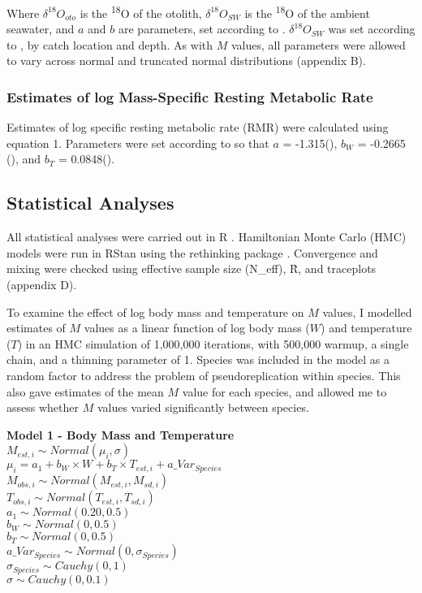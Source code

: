 \documentclass[12pt, titlepage]{article}
\begin{document}
\noindent Where $\delta^{18}O_{oto}$ is the \textdelta \textsuperscript{18}O of the otolith, $\delta^{18}O_{SW}$ is the \textdelta \textsuperscript{18}O of the ambient seawater, and $a$ and $b$ are parameters, set according to \cite{Hoie2004}. $\delta^{18}O_{SW}$  was set according to \cite{Schmidt1999}, by catch location and depth. 
As with $M$ values, all parameters were allowed to vary across normal and truncated normal distributions (appendix B).

\subsubsection{Estimates of log Mass-Specific Resting Metabolic Rate}

Estimates of log specific resting metabolic rate (RMR) were calculated using equation 1.
Parameters were set according to \cite{Belcher2019} so that $a$ = -1.315(), $b_{W}$ = -0.2665 (), and $b_{T}$ = 0.0848().

\subsection{Statistical Analyses}

All statistical analyses were carried out in R \citep{R}. Hamiltonian Monte Carlo (HMC) models were run in RStan \citep{RStan} using the rethinking package \citep{Rethinking}. Convergence and mixing were checked using effective sample size (N\_eff), \^R, and traceplots (appendix D).

To examine the effect of log body mass and temperature on $M$ values, I modelled estimates of $M$ values as a linear function of log body mass ($W$) and temperature ($T$) in an HMC simulation of 1,000,000 iterations, with 500,000 warmup, a single chain, and a thinning parameter of 1. 
Species was included in the model as a random factor to address the problem of pseudoreplication within species.
This also gave estimates of the mean $M$ value for each species, and allowed me to assess whether $M$ values varied significantly between species.

\begin{center}
\textbf{Model 1 - Body Mass and Temperature}
\\$M_{est, i} \sim Normal(\mu_{i}, \sigma)$
\\$\mu_{i} = a_{1} + b_{W} \times W + b_{T} \times T_{est, i} + a\_Var_{Species}$
\\$M_{obs, i} \sim Normal(M_{est, i}, M_{sd, i})$
\\$T_{obs, i} \sim Normal(T_{est, i}, T_{sd, i})$
\\$a_{1} \sim Normal(0.20, 0.5)$
\\$b_{W} \sim Normal(0, 0.5)$
\\$b_{T} \sim Normal(0, 0.5)$
\\$a\_Var_{Species} \sim Normal(0, \sigma_{Species})$
\\$\sigma_{Species} \sim Cauchy(0, 1)$
\\$\sigma \sim Cauchy(0, 0.1)$
\label{mod:WT}
\end{center}
\end{document}
